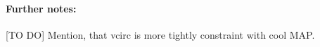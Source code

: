 

\paragraph{Further notes:} [TO DO] Mention, that vcirc is more tightly constraint with cool MAP. 

